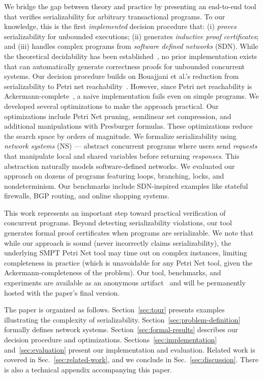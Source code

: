 We bridge the gap between theory and practice by presenting an end-to-end tool that verifies serializability for arbitrary transactional programs.
To our knowledge, this is the first \emph{implemented} decision procedure that: (i) \textit{proves} serializability for unbounded executions; (ii) generates \textit{inductive proof certificates}; and (iii) handles complex programs from \textit{software defined networks} (SDN).
While the theoretical decidability has been established~\cite{BoEmEnHa13}, no prior implementation exists that can automatically generate correctness proofs for unbounded concurrent systems.
%
Our decision procedure builds on Bouajjani et al.'s reduction from serializability to Petri net reachability~\cite{BoEmEnHa13}. However, since Petri net reachability is Ackermann-complete~\cite{CzWo22}, a naive implementation fails even on simple programs. We developed several optimizations to make the approach practical. 
Our optimizations include Petri Net pruning, semilinear set compression, and additional manipulations with Presburger formulas.
These optimizations reduce the search space by orders of magnitude.
%
We formalize serializability using \textit{network systems} (NS) --- abstract concurrent programs where users send \textit{requests} that manipulate local and shared variables before returning \textit{responses}. This abstraction naturally models software-defined networks.
We evaluated our approach on dozens of programs featuring loops, branching, locks, and nondeterminism. Our benchmarks include SDN-inspired examples like stateful firewalls, BGP routing, and online shopping systems.


This work represents an important step toward practical verification of concurrent programs.
Beyond detecting serializability violations, our tool generates formal proof certificates when programs are serializable.
We note that while our approach is sound (never incorrectly claims serializability), the underlying SMPT Petri Net tool may time out on complex instances, limiting completeness in practice (which is unavoidable for any Petri Net tool, given the Ackermann-completeness of the problem).
Our tool, benchmarks, and experiments are available as an anonymous artifact~\cite{ArtifactRepository} and will be permanently hosted with the paper’s final version.

The paper is organized as follows. Section~\ref{sec:tour} presents examples illustrating the complexity of serializability. Section~\ref{sec:problem-definition} formally defines network systems. Section~\ref{sec:formal-results} describes our decision procedure and optimizations. Sections~\ref{sec:implementation} and~\ref{sec:evaluation} present our implementation and evaluation. 
Related work is covered in Sec.~\ref{sec:related-work}, and we conclude in Sec.~\ref{sec:discussion}.
%
There is also a technical appendix accompanying this paper.





